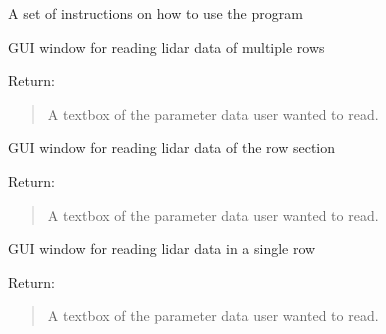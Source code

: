 \documentclass[letterpaper,10pt,english]{sphinxmanual}
\begin{document}
\begin{fulllineitems}
\label{\detokenize{Library GUI:library_gui.instruction}}
A set of instructions on how to use the program

\end{fulllineitems}


\begin{fulllineitems}
\label{\detokenize{Library GUI:library_gui.lidar_multiple_row}}
GUI window for reading lidar data of multiple rows

Return:
\begin{quote}

A textbox of the parameter data user wanted to read.
\end{quote}

\end{fulllineitems}


\begin{fulllineitems}
\label{\detokenize{Library GUI:library_gui.lidar_row_section}}
GUI window for reading lidar data of the row section

Return:
\begin{quote}

A textbox of the parameter data user wanted to read.
\end{quote}

\end{fulllineitems}


\begin{fulllineitems}
\label{\detokenize{Library GUI:library_gui.lidar_single_row}}
GUI window for reading lidar data in a single row

Return:
\begin{quote}

A textbox of the parameter data user wanted to read.
\end{quote}

\end{fulllineitems}
\end{document}
